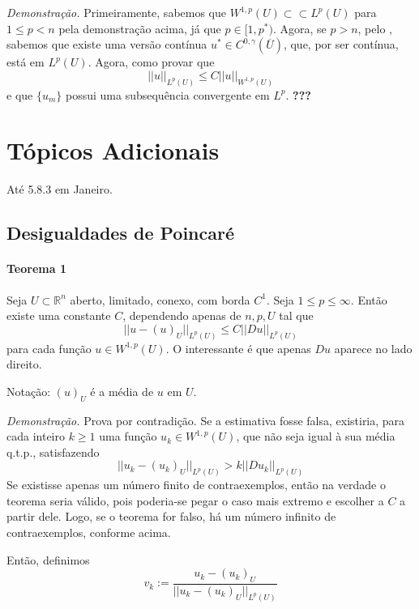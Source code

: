 \documentclass[a4paper, 11pt]{book}
\begin{document}
\textit{Demonstração.} Primeiramente, sabemos que $W^{1,p}(U) \subset\subset L^p(U)$ para $1\leq p < n$ pela demonstração acima, já que $p \in [1,p^*)$. Agora, se $p>n$, pelo , sabemos que existe uma versão contínua $u^* \in C^{0, \gamma}(\overline{U})$, que, por ser contínua, está em $L^p(U)$. Agora, como provar que \[ ||u||_{L^p(U)} \leq C ||u||_{W^{1,p}(U)} \] e que $\{u_m\}$ possui uma subsequência convergente em $L^p$. \textbf{???}








\section{Tópicos Adicionais}

Até 5.8.3 em Janeiro.


\subsection{Desigualdades de Poincaré}

\paragraph{Teorema 1}\label{t:sobolev-poincare-1} Seja \(U \subset \mathbb{R}^n \) aberto, limitado, conexo, com borda \(C^1\). Seja \(1 \leq p \leq \infty \). Então existe uma constante \(C\), dependendo apenas de \(n, p, U\) tal que \[ ||u- (u)_U ||_{L^p(U)} \leq C ||Du||_{L^p(U)} \] para cada função \(u \in W^{1,p}(U)\). O interessante é que apenas \(Du\) aparece no lado direito.

Notação: \((u)_U\) é a média de \(u\) em \(U\).

\textit{Demonstração.} Prova por contradição. Se a estimativa fosse falsa, existiria, para cada inteiro $k\geq1$ uma função $u_k \in W^{1,p}(U)$, que não seja igual à sua média q.t.p., satisfazendo \begin{equation}\label{eq:desig-poincare-1}
	 ||u_k - (u_k)_U ||_{L^p(U)} > k || Du_k ||_{L^p(U)}
\end{equation} Se existisse apenas um número finito de contraexemplos, então na verdade o teorema seria válido, pois poderia-se pegar o caso mais extremo e escolher a $C$ a partir dele. Logo, se o teorema for falso, há um número infinito de contraexemplos, conforme acima.

Então, definimos \[v_k := \frac{u_k - (u_k)_U}{||u_k - (u_k)_U||_{L^p(U)}} \]
\end{document}
